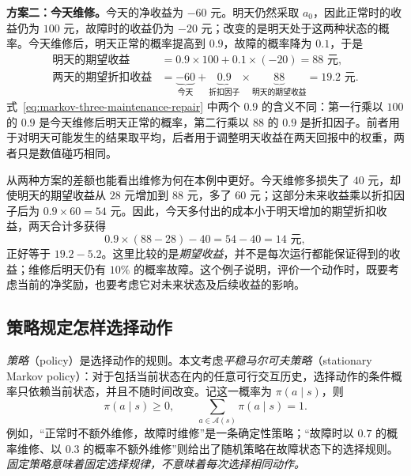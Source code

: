 \documentclass[UTF8,12pt,a4paper,fontset=fandol]{ctexart}
\begin{document}
\begin{example}[维修的短期成本与后续收益]
\textbf{方案二：今天维修。}今天的净收益为 $-60$ 元。明天仍然采取 $a_0$，因此正常时的收益仍为 $100$ 元，故障时的收益仍为 $-20$ 元；改变的是明天处于这两种状态的概率。今天维修后，明天正常的概率提高到 $0.9$，故障的概率降为 $0.1$，于是
\begin{equation}
  \begin{aligned}
    \text{明天的期望收益}
      &=0.9\times100+0.1\times(-20)=88\text{ 元},\\
    \text{两天的期望折扣收益}
      &=\underbrace{-60}_{\text{今天}}
        +\underbrace{0.9}_{\text{折扣因子}}\times
         \underbrace{88}_{\text{明天的期望收益}}
        =19.2\text{ 元}.
  \end{aligned}
  \label{eq:markov-three-maintenance-repair}
\end{equation}
式~\eqref{eq:markov-three-maintenance-repair} 中两个 $0.9$ 的含义不同：第一行乘以 $100$ 的 $0.9$ 是今天维修后明天正常的概率，第二行乘以 $88$ 的 $0.9$ 是折扣因子。前者用于对明天可能发生的结果取平均，后者用于调整明天收益在两天回报中的权重，两者只是数值碰巧相同。

从两种方案的差额也能看出维修为何在本例中更好。今天维修多损失了 $40$ 元，却使明天的期望收益从 $28$ 元增加到 $88$ 元，多了 $60$ 元；这部分未来收益乘以折扣因子后为 $0.9\times60=54$ 元。因此，今天多付出的成本小于明天增加的期望折扣收益，两天合计多获得
\begin{equation}
  0.9\times(88-28)-40=54-40=14\text{ 元},
  \label{eq:markov-three-maintenance-gain}
\end{equation}
正好等于 $19.2-5.2$。这里比较的是\emph{期望收益}，并不是每次运行都能保证得到的收益；维修后明天仍有 $10\%$ 的概率故障。这个例子说明，评价一个动作时，既要考虑当前的净奖励，也要考虑它对未来状态及后续收益的影响。
\end{example}

\subsection{策略规定怎样选择动作}

\emph{策略}（policy）是选择动作的规则。本文考虑\emph{平稳马尔可夫策略}（stationary Markov policy）：对于包括当前状态在内的任意可行交互历史，选择动作的条件概率只依赖当前状态，并且不随时间改变。记这一概率为 $\pi(a\mid s)$，则
\[
  \pi(a\mid s)\geq0,\qquad
  \sum_{a\in\mathcal A(s)}\pi(a\mid s)=1.
\]
例如，“正常时不额外维修，故障时维修”是一条确定性策略；“故障时以 $0.7$ 的概率维修、以 $0.3$ 的概率不额外维修”则给出了随机策略在故障状态下的选择规则。\emph{固定策略意味着固定选择规律，不意味着每次选择相同动作。}
\end{document}
